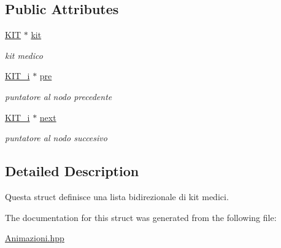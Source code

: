 \subsection*{Public Attributes}
\begin{DoxyCompactItemize}
\item 
\hypertarget{structKIT__i_a6edcec5a34f35c40b93a2b04e5037e65}{}\hyperlink{structKIT}{K\+I\+T} $\ast$ \hyperlink{structKIT__i_a6edcec5a34f35c40b93a2b04e5037e65}{kit}\label{structKIT__i_a6edcec5a34f35c40b93a2b04e5037e65}

\begin{DoxyCompactList}\small\item\em kit medico \end{DoxyCompactList}\item 
\hypertarget{structKIT__i_aea986829d6c2d2da88cb78b93e5b0ae3}{}\hyperlink{structKIT__i}{K\+I\+T\+\_\+i} $\ast$ \hyperlink{structKIT__i_aea986829d6c2d2da88cb78b93e5b0ae3}{pre}\label{structKIT__i_aea986829d6c2d2da88cb78b93e5b0ae3}

\begin{DoxyCompactList}\small\item\em puntatore al nodo precedente \end{DoxyCompactList}\item 
\hypertarget{structKIT__i_a81d57e322a6b294a56152c8e12afca76}{}\hyperlink{structKIT__i}{K\+I\+T\+\_\+i} $\ast$ \hyperlink{structKIT__i_a81d57e322a6b294a56152c8e12afca76}{next}\label{structKIT__i_a81d57e322a6b294a56152c8e12afca76}

\begin{DoxyCompactList}\small\item\em puntatore al nodo succesivo \end{DoxyCompactList}\end{DoxyCompactItemize}


\subsection{Detailed Description}
Questa struct definisce una lista bidirezionale di kit medici. 

The documentation for this struct was generated from the following file\+:\begin{DoxyCompactItemize}
\item 
\hyperlink{Animazioni_8hpp}{Animazioni.\+hpp}\end{DoxyCompactItemize}
